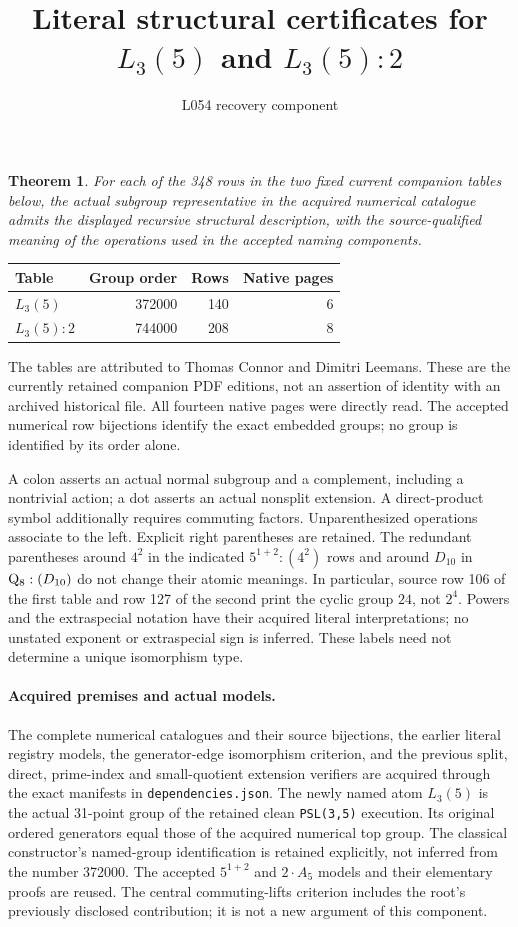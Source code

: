 \documentclass[11pt]{article}
\title{Literal structural certificates for $L_3(5)$ and $L_3(5):2$}
\author{L054 recovery component}\date{}
\newtheorem{theorem}{Theorem}\newtheorem{lemma}{Lemma}
\begin{document}
\maketitle
\begin{theorem}
For each of the 348 rows in the two fixed current companion tables below,
the actual subgroup representative in the acquired numerical catalogue admits
the displayed recursive structural description, with the source-qualified
meaning of the operations used in the accepted naming components.
\end{theorem}
\begin{center}\begin{tabular}{lrrr}\toprule
Table & Group order & Rows & Native pages\\\midrule
$L_3(5)$ &372000&140&6\\
$L_3(5):2$ &744000&208&8\\\bottomrule
\end{tabular}\end{center}
The tables are attributed to Thomas Connor and Dimitri Leemans. These are the
currently retained companion PDF editions, not an assertion of identity with
an archived historical file. All fourteen native pages were directly read.
The accepted numerical row bijections identify the exact embedded groups;
no group is identified by its order alone.

A colon asserts an actual normal subgroup and a complement, including a
nontrivial action; a dot asserts an actual nonsplit extension. A direct-product
symbol additionally requires commuting factors. Unparenthesized operations
associate to the left. Explicit right parentheses are retained. The redundant
parentheses around $4^2$ in the indicated $5^{1+2}:(4^2)$ rows and around
$D_{10}$ in $\mathrm Q_8:(D_{10})$ do not change their atomic meanings. In particular,
source row 106 of the first table and row 127 of the second print the cyclic
group $24$, not $2^4$. Powers and the extraspecial notation have their acquired
literal interpretations; no unstated exponent or extraspecial sign is inferred.
These labels need not determine a unique isomorphism type.

\paragraph{Acquired premises and actual models.}
The complete numerical catalogues and their source bijections, the earlier
literal registry models, the generator-edge isomorphism criterion, and the
previous split, direct, prime-index and small-quotient extension verifiers
are acquired through the exact manifests in \texttt{dependencies.json}.
The newly named atom $L_3(5)$ is the actual 31-point group of the retained clean
\texttt{PSL(3,5)} execution. Its original ordered generators equal those of
the acquired numerical top group. The classical constructor's named-group
identification is retained explicitly, not inferred from the number 372000.
The accepted $5^{1+2}$ and $2\mathbin{\cdot}A_5$ models and their elementary
proofs are reused. The central commuting-lifts criterion includes the root's
previously disclosed contribution; it is not a new argument of this component.
\end{document}
